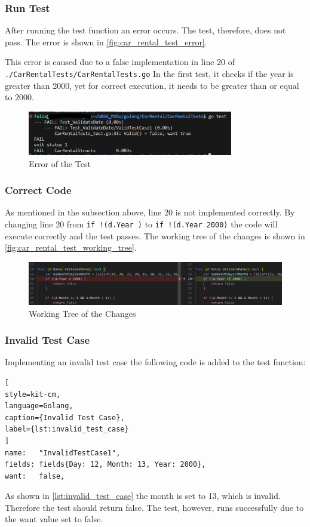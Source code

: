 \subsubsection*{Run Test}
After running the test function an error occurs. 
The test, therefore, does not pass.
The error is shown in \autoref{fig:car_rental_test_error}.

This error is caused due to a false implementation in line 20 of \hfill \linebreak \texttt{./CarRentalTests/CarRentalTests.go}
In the first test, it checks if the year is greater than 2000, yet for correct execution, it needs to be greater than or equal to 2000.

\begin{figure}[H]
    \centering
    \includegraphics[width=0.8\textwidth]{figures/goLang/carRental/carRental_dateTestError.png}
    \caption{Error of the Test}
    \label{fig:car_rental_test_error}
\end{figure}

\subsubsection*{Correct Code}
As mentioned in the subsection above, line 20 is not implemented correctly.
By changing line 20 from \texttt{if !(d.Year )} to \texttt{if !(d.Year \>\= 2000)} the code will execute correctly and the test passes.
The working tree of the changes is shown in \autoref{fig:car_rental_test_working_tree}.

\begin{figure}[H]
    \centering
    \includegraphics[width=\textwidth]{figures/goLang/carRental/carRental_dateTestWorkingTree.png}
    \caption{Working Tree of the Changes}
    \label{fig:car_rental_test_working_tree}
\end{figure}

\subsubsection*{Invalid Test Case}
Implementing an invalid test case the following code is added to the test function:
\begin{lstlisting}[
style=kit-cm,
language=Golang,
caption={Invalid Test Case},
label={lst:invalid_test_case}
]
name:   "InvalidTestCase1",
fields: fields{Day: 12, Month: 13, Year: 2000},
want:   false,  
\end{lstlisting}

As shown in \autoref{lst:invalid_test_case} the month is set to 13, which is invalid.
Therefore the test should return false.
The test, however, runs successfully due to the want value set to false.
